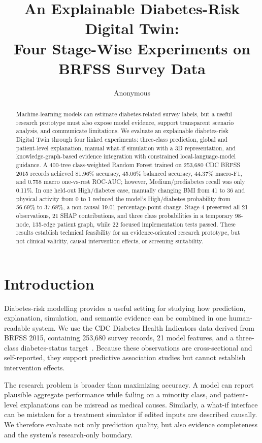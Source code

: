 \documentclass[11pt]{article}
\title{An Explainable Diabetes-Risk Digital Twin:\\Four Stage-Wise Experiments on BRFSS Survey Data}
\author{Anonymous}
\date{}
\begin{document}
\maketitle

\begin{abstract}
Machine-learning models can estimate diabetes-related survey labels, but a useful research prototype must also expose model evidence, support transparent scenario analysis, and communicate limitations. We evaluate an explainable diabetes-risk Digital Twin through four linked experiments: three-class prediction, global and patient-level explanation, manual what-if simulation with a 3D representation, and knowledge-graph-based evidence integration with constrained local-language-model guidance. A 400-tree class-weighted Random Forest trained on 253,680 CDC BRFSS 2015 records achieved 81.96\% accuracy, 45.06\% balanced accuracy, 44.37\% macro-F1, and 0.758 macro one-vs-rest ROC-AUC; however, Medium/prediabetes recall was only 0.11\%. In one held-out High/diabetes case, manually changing BMI from 41 to 36 and physical activity from 0 to 1 reduced the model's High/diabetes probability from 56.69\% to 37.68\%, a non-causal 19.01 percentage-point change. Stage 4 preserved all 21 observations, 21 SHAP contributions, and three class probabilities in a temporary 98-node, 135-edge patient graph, while 22 focused implementation tests passed. These results establish technical feasibility for an evidence-oriented research prototype, but not clinical validity, causal intervention effects, or screening suitability.
\end{abstract}

\section{Introduction}

Diabetes-risk modelling provides a useful setting for studying how prediction, explanation, simulation, and semantic evidence can be combined in one human-readable system. We use the CDC Diabetes Health Indicators data derived from BRFSS 2015, containing 253,680 survey records, 21 model features, and a three-class diabetes-status target~\cite{uci}. Because these observations are cross-sectional and self-reported, they support predictive association studies but cannot establish intervention effects.

The research problem is broader than maximizing accuracy. A model can report plausible aggregate performance while failing on a minority class, and patient-level explanations can be misread as medical causes. Similarly, a what-if interface can be mistaken for a treatment simulator if edited inputs are described causally. We therefore evaluate not only prediction quality, but also evidence completeness and the system's research-only boundary.
\end{document}
